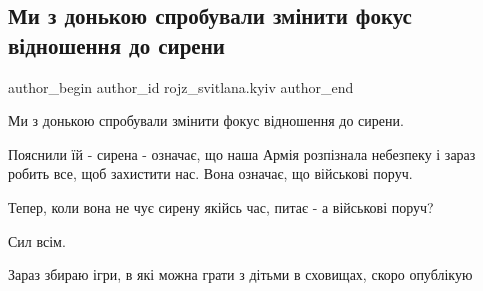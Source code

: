  
 
 
 
 
 
\subsection{Ми з донькою спробували змінити фокус відношення до сирени}
\label{sec:26_02_2022.fb.rojz_svitlana.kyiv.2.sirena}
 
\ifcmt
 author_begin
   author_id rojz_svitlana.kyiv
 author_end
\fi

Ми з донькою спробували змінити фокус відношення до сирени.

Пояснили їй - сирена - означає, що наша Армія розпізнала небезпеку і зараз
робить все, щоб захистити нас. Вона означає, що військові поруч. 

Тепер, коли вона не чує сирену якійсь час, питає - а військові поруч? 

Сил всім. 

Зараз збираю ігри, в які можна грати з дітьми  в сховищах, скоро опублікую

